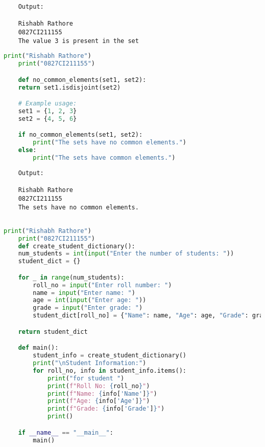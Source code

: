 \documentclass{report}
\begin{document}
\begin{verbatim}
	Output:

	Rishabh Rathore
	0827CI211155
	The value 3 is present in the set

\end{verbatim}


\newpage


\sol 
\begin{lstlisting}[language=Python]
	print("Rishabh Rathore")
	print("0827CI211155")

	def no_common_elements(set1, set2):
    return set1.isdisjoint(set2)

	# Example usage:
	set1 = {1, 2, 3}
	set2 = {4, 5, 6}

	if no_common_elements(set1, set2):
		print("The sets have no common elements.")
	else:
		print("The sets have common elements.")

\end{lstlisting}

\begin{verbatim}
	Output:

	Rishabh Rathore
	0827CI211155
	The sets have no common elements.


\end{verbatim}


\newpage


\sol 
\begin{lstlisting}[language=Python]
	print("Rishabh Rathore")
	print("0827CI211155")
	def create_student_dictionary():
    num_students = int(input("Enter the number of students: "))
    student_dict = {}

    for _ in range(num_students):
        roll_no = input("Enter roll number: ")
        name = input("Enter name: ")
        age = int(input("Enter age: "))
        grade = input("Enter grade: ")
        student_dict[roll_no] = {"Name": name, "Age": age, "Grade": grade}

    return student_dict

	def main():
		student_info = create_student_dictionary()
		print("\nStudent Information:")
		for roll_no, info in student_info.items():
			print("for student ")
			print(f"Roll No: {roll_no}")
			print(f"Name: {info['Name']}")
			print(f"Age: {info['Age']}")
			print(f"Grade: {info['Grade']}")
			print()

	if __name__ == "__main__":
		main()
  

\end{lstlisting}
\end{document}
